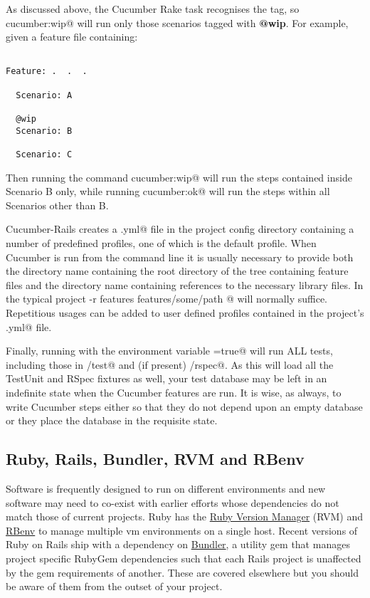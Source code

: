 As discussed above, the Cucumber Rake task recognises the \verb@@wip@ tag, so \verb@rake cucumber:wip@ will run only those scenarios tagged with \textbf{@wip}.  For example, given a feature file containing:

\begin{verbatim}

Feature: .  .  .

  Scenario: A

  @wip
  Scenario: B

  Scenario: C

\end{verbatim}
Then running the command \verb@rake cucumber:wip@ will run the steps contained inside Scenario B only, while running \verb@rake cucumber:ok@ will run the steps within all Scenarios other than B.

Cucumber-Rails creates a \verb@cucumber.yml@ file in the project config directory containing a number of predefined profiles, one of which is the default profile.  When Cucumber is run from the command line it is usually necessary to provide both the directory name containing the root directory of the tree containing feature files and the directory name containing references to the necessary library files.  In the typical project \verb@cucumber -r features features/some/path @ will normally suffice.  Repetitious usages can be added to user defined profiles contained in the project's \verb@cucumber.yml@ file.

Finally, running \verb@autotest@ with the environment variable \verb@AUTOFEATURE=true@ will run ALL tests, including those in \verb@/test@ and (if present) \verb@/rspec@.  As this will load all the TestUnit and RSpec fixtures as well, your test database may be left in an indefinite state when the Cucumber features are run.  It is wise, as always, to write Cucumber steps either so that they do not depend upon an empty database or they place the database in the requisite state.

\subsection{Ruby, Rails, Bundler, RVM and RBenv}

Software is frequently designed to run on different environments and new software may need to co-exist with earlier efforts whose dependencies do not match those of current projects. Ruby has the \href{http://rvm.io/}{Ruby Version Manager} (RVM) and \href{https://github.com/sstephenson/rbenv.git}{RBenv} to manage multiple vm environments on a single host.  Recent versions of Ruby on Rails ship with a dependency on \href{http://gembundler.com/}{Bundler}, a utility gem that manages project specific RubyGem dependencies such that each Rails project is unaffected by the gem requirements of another.  These are covered elsewhere but you should be aware of them from the outset of your project.


